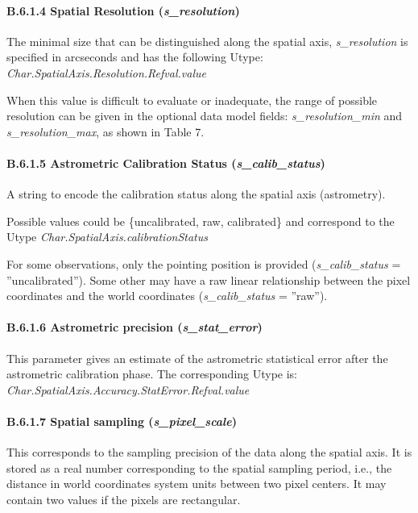\documentclass[11pt,a4paper]{ivoa}
\begin{document}
\paragraph{B.6.1.4 Spatial Resolution (\emph{s\_resolution})}
The minimal size that can be distinguished along the spatial axis, \emph{s\_resolution} is specified in arcseconds and has the
following Utype: \emph{Char.SpatialAxis.Resolution.Refval.value}

When this value is difficult to evaluate or inadequate, the range of possible resolution can be given in the optional
data model fields: \emph{s\_resolution\_min} and \emph{s\_resolution\_max}, as shown in Table 7.

\paragraph{B.6.1.5 Astrometric Calibration Status (\emph{s\_calib\_status})}
A string to encode the calibration status along the spatial axis (astrometry).

Possible values could be \{uncalibrated, raw, calibrated\} and correspond to the Utype
\emph{Char.SpatialAxis.calibrationStatus}

For some observations, only the pointing position is provided (\emph{s\_calib\_status} = ''uncalibrated''). Some other may have
a raw linear relationship between the pixel coordinates and the world coordinates (\emph{s\_calib\_status} = ''raw'').

\paragraph{B.6.1.6 Astrometric precision (\emph{s\_stat\_error})}
This parameter gives an estimate of the astrometric statistical error after the astrometric calibration phase.  The
corresponding Utype is:  \emph{Char.SpatialAxis.Accuracy.StatError.Refval.value}

\paragraph{B.6.1.7 Spatial sampling (\emph{s\_pixel\_scale})}
This corresponds to the sampling precision of the data along the spatial axis. It is stored as a real number
corresponding to the spatial sampling period, i.e., the distance in world coordinates system units between two pixel
centers.  It may contain two values if the pixels are rectangular.
\end{document}
